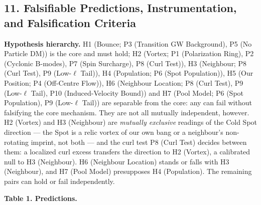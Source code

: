\documentclass[
]{article}
\begin{document}
\hypertarget{falsifiable-predictions-instrumentation-and-falsification-criteria}{%
\subsection{\texorpdfstring{\textbf{11. Falsifiable Predictions,
Instrumentation, and Falsification
Criteria}}{11. Falsifiable Predictions, Instrumentation, and Falsification Criteria}}\label{falsifiable-predictions-instrumentation-and-falsification-criteria}}

\textbf{Hypothesis hierarchy.} H1 (Bounce; P3 (Transition GW
Background), P5 (No Particle DM)) is the core and must hold; H2 (Vortex;
P1 (Polarization Ring), P2 (Cyclonic B-modes), P7 (Spin Surcharge), P8
(Curl Test)), H3 (Neighbour; P8 (Curl Test), P9 (Low-\(\ell\) Tail)), H4
(Population; P6 (Spot Population)), H5 (Our Position; P4 (Off-Centre
Flow)), H6 (Neighbour Location; P8 (Curl Test), P9 (Low-\(\ell\) Tail),
P10 (Induced-Velocity Bound)) and H7 (Pool Model; P6 (Spot Population),
P9 (Low-\(\ell\) Tail)) are separable from the core: any can fail
without falsifying the core mechanism. They are not all mutually
independent, however. H2 (Vortex) and H3 (Neighbour) are \emph{mutually
exclusive} readings of the Cold Spot direction --- the Spot is a relic
vortex of our own bang or a neighbour's non-rotating imprint, not both
--- and the curl test P8 (Curl Test) decides between them: a localized
curl excess transfers the direction to H2 (Vortex), a calibrated null to
H3 (Neighbour). H6 (Neighbour Location) stands or falls with H3
(Neighbour), and H7 (Pool Model) presupposes H4 (Population). The
remaining pairs can hold or fail independently.

\textbf{Table 1. Predictions.}
\end{document}
